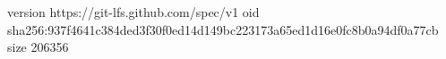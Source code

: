 version https://git-lfs.github.com/spec/v1
oid sha256:937f4641c384ded3f30f0ed14d149bc223173a65ed1d16e0fc8b0a94df0a77cb
size 206356
